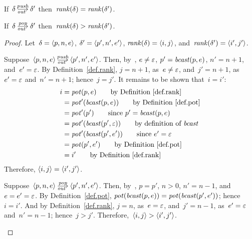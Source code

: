 
\begin{lemma}\strut
  \label{lem.rank-out}
  \begin{enumerate:a}
  \item\label{lem.rank-out-push} If~$\delta\outpush\delta'$
    then~$\operatorname{\mathit{rank}}(\delta)=\operatorname{\mathit{rank}}(\delta')$.
  \item\label{lem.rank-out-pop} If~$\delta\outpop\delta'$
    then~$\operatorname{\mathit{rank}}(\delta)>\operatorname{\mathit{rank}}(\delta')$.
  \end{enumerate:a}
\end{lemma}
\begin{proof}\strut
  Let~$\delta=\<p,n,e>$, $\delta'=\<p',n',e'>$,
  $\rank(\delta)=\<i,j>$, and~$\rank(\delta')=\<i',j'>$.
  \begin{enumerate:a}
  \item Suppose~$\<p,n,e>\outpush\<p',n',e'>$.  Then, by~,
    $e\ne\varepsilon$, $p'=\operatorname{\mathit{bcast}}(p,e)$, $n'=n+1$, and~$e'=\varepsilon$.  By
    Definition~\ref{def.rank}, $j=n+1$, as~$e\ne\varepsilon$, and~$j'=n+1$,
    as~$e'=\varepsilon$ and~$n'=n+1$; hence~$j=j'$.
    It remains to be shown that~$i=i'$:
    \begin{align*}
      i&=\pot(p,e)
         \tag*{by Definition~\ref{def.rank}}\\
       &=\pot'(\bcast(p,e))
         \tag*{by Definition~\ref{def.pot}}\\
       &=\pot'(p')
         \tag*{since~$p'=\bcast(p,e)$}\\
       &=\pot'(\bcast(p',\nil))
         \tag*{by definition of~$\bcast$}\\
       &=\pot'(\bcast(p',e'))
         \tag*{since~$e'=\nil$}\\
       &=\pot(p',e')
         \tag*{by Definition~\ref{def.pot}}\\
       &=i'
         \tag*{by Definition~\ref{def.rank}}
    \end{align*}
    Therefore, $\<i,j>=\<i',j'>$.

  \item Suppose~$\<p,n,e>\outpop\<p',n',e'>$.  Then, by~, $p=p'$,
    $n>0$, $n'=n-1$, and~$e=e'=\varepsilon$.
    By Definition~\ref{def.pot}, $\operatorname{\mathit{pot}}(\operatorname{\mathit{bcast}}(p,e))=\operatorname{\mathit{pot}}(\operatorname{\mathit{bcast}}(p',e'))$;
    hence~$i=i'$.  And by Definition~\ref{def.rank}, $j=n$, as~$e=\varepsilon$,
    and~$j'=n-1$, as~$e'=\varepsilon$ and~$n'=n-1$; hence~$j>j'$.
    Therefore,~${\<i,j>}>{\<i',j'>}$.\qedhere
  \end{enumerate:a}
\end{proof}

